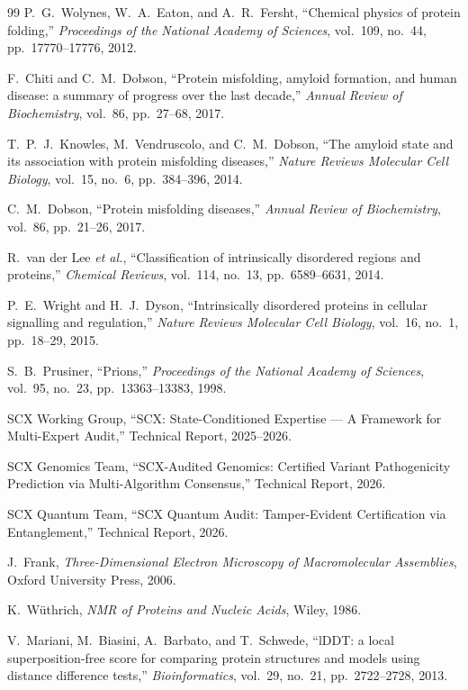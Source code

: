\documentclass[12pt,a4paper]{article}
\theoremstyle{remark}
\newcommand{\SCX}{\textsf{SCX}}
\begin{document}
\begin{thebibliography}{99}
P.~G.~Wolynes, W.~A.~Eaton, and A.~R.~Fersht,
``Chemical physics of protein folding,''
\textit{Proceedings of the National Academy of Sciences}, vol.~109, no.~44, pp.~17770--17776, 2012.

F.~Chiti and C.~M.~Dobson,
``Protein misfolding, amyloid formation, and human disease: a summary of progress over the last decade,''
\textit{Annual Review of Biochemistry}, vol.~86, pp.~27--68, 2017.

T.~P.~J.~Knowles, M.~Vendruscolo, and C.~M.~Dobson,
``The amyloid state and its association with protein misfolding diseases,''
\textit{Nature Reviews Molecular Cell Biology}, vol.~15, no.~6, pp.~384--396, 2014.

C.~M.~Dobson,
``Protein misfolding diseases,''
\textit{Annual Review of Biochemistry}, vol.~86, pp.~21--26, 2017.

R.~van der Lee \textit{et al.},
``Classification of intrinsically disordered regions and proteins,''
\textit{Chemical Reviews}, vol.~114, no.~13, pp.~6589--6631, 2014.

P.~E.~Wright and H.~J.~Dyson,
``Intrinsically disordered proteins in cellular signalling and regulation,''
\textit{Nature Reviews Molecular Cell Biology}, vol.~16, no.~1, pp.~18--29, 2015.

S.~B.~Prusiner,
``Prions,''
\textit{Proceedings of the National Academy of Sciences}, vol.~95, no.~23, pp.~13363--13383, 1998.

\SCX{} Working Group,
``SCX: State-Conditioned Expertise — A Framework for Multi-Expert Audit,''
Technical Report, 2025--2026.

\SCX{} Genomics Team,
``SCX-Audited Genomics: Certified Variant Pathogenicity Prediction via Multi-Algorithm Consensus,''
Technical Report, 2026.

\SCX{} Quantum Team,
``SCX Quantum Audit: Tamper-Evident Certification via Entanglement,''
Technical Report, 2026.

J.~Frank,
\textit{Three-Dimensional Electron Microscopy of Macromolecular Assemblies},
Oxford University Press, 2006.

K.~W\"uthrich,
\textit{NMR of Proteins and Nucleic Acids},
Wiley, 1986.

V.~Mariani, M.~Biasini, A.~Barbato, and T.~Schwede,
``lDDT: a local superposition-free score for comparing protein structures and models using distance difference tests,''
\textit{Bioinformatics}, vol.~29, no.~21, pp.~2722--2728, 2013.


\end{thebibliography}
\end{document}
